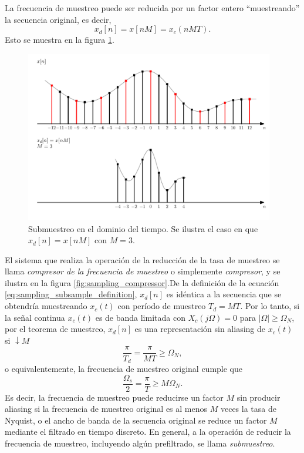 \documentclass[a4paper]{report}
\begin{document}
La frecuencia de muestreo puede ser reducida por un factor entero ``muestreando'' la secuencia original, es decir,
\begin{equation}\label{eq:sampling_subsample_definition}
 x_d[n]=x[nM]=x_c(nMT). 
\end{equation}
Esto se muestra en la figura \ref{fig:sampling_reduce_sampling_rate_time_domain}.
\begin{figure}[!htb]
 \begin{center}
 \includegraphics[width=0.97\textwidth]{figuras/sampling_reduce_sampling_rate_time_domain.pdf}
 \caption{\label{fig:sampling_reduce_sampling_rate_time_domain} Submuestreo en el dominio del tiempo. Se ilustra el caso en que \(x_d[n]=x[nM]\) con \(M=3\).}
 \end{center}
\end{figure}
El sistema que realiza la operación de la reducción de la tasa de muestreo se llama \emph{compresor de la frecuencia de muestreo}  o simplemente \emph{compresor}, y se ilustra en la figura \ref{fig:sampling_compressor}.De la definición de la ecuación \ref{eq:sampling_subsample_definition}, \(x_d[n]\) es idéntica a la secuencia que se obtendría muestreando \(x_c(t)\) con período de muestreo \(T_d=MT\). Por lo tanto, si la señal continua \(x_c(t)\) es de banda limitada con
\(X_c(j\Omega)=0\) para \(|\Omega|\geq\Omega_N\), por el teorema de muestreo, \(x_d[n]\) es una representación sin aliasing de \(x_c(t)\) si \(\downarrow M\)
\[
 \frac{\pi}{T_d}=\frac{\pi}{MT}\geq\Omega_N,
\]
o equivalentemente, la frecuencia de muestreo original cumple que
\[
 \frac{\Omega_s}{2}=\frac{\pi}{T}\geq M\Omega_N.
\]
Es decir, la frecuencia de muestreo puede reducirse un factor \(M\) sin producir aliasing si la frecuencia de muestreo original es al menos \(M\) veces la tasa de Nyquist, o el ancho de banda de la secuencia original se reduce un factor \(M\) mediante el filtrado en tiempo discreto. En general, a la operación de reducir la frecuencia de muestreo, incluyendo algún prefiltrado, se llama \emph{submuestreo}. 
\end{document}
